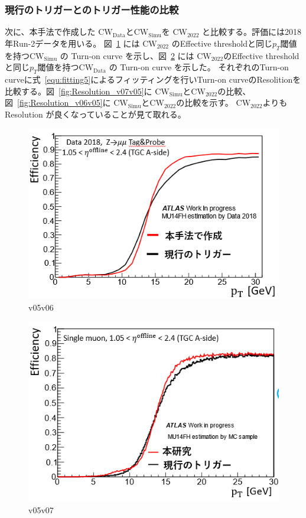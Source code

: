 \subsubsection{現行のトリガーとのトリガー性能の比較}
次に、本手法で作成した $\mathrm{CW_{Data}}$と$\mathrm{CW_{Simu}}$を $\mathrm{CW_{2022}}$ と比較する。評価には2018年Run-2データを用いる。
図~\ref{fig:v05v06} には $\mathrm{CW_{2022}}$ のEffective thresholdと同じ$p_T$閾値を持つ$\mathrm{CW_{Simu}}$ の Turn-on curve を示し、図~\ref{fig:v05v07} には $\mathrm{CW_{2022}}$のEffective thresholdと同じ$p_T$閾値を持つ$\mathrm{CW_{Data}}$ の Turn-on curve を示した。
それぞれのTurn-on curveに式~\eqref{equ:fitting5}によるフィッティングを行いTurn-on curveのResolitionを比較する。図~\ref{fig:Resolution_v07v05}に $\mathrm{CW_{Simu}}$と$\mathrm{CW_{2022}}$の比較、図~\ref{fig:Resolution_v06v05}に $\mathrm{CW_{Simu}}$と$\mathrm{CW_{2022}}$の比較を示す。
$\mathrm{CW_{2022}}$よりも Resolution が良くなっていることが見て取れる。

\begin{figure}[tb]
  \centering
  \includegraphics[clip, width=12cm]{fig/4/hikaku_v05_v06.png}
  \caption{v05v06}
  \label{fig:v05v06}
\end{figure}

\begin{figure}[tb]
  \centering
  \includegraphics[clip, width=12cm]{fig/4/hikaku_v05_v07.png}
  \caption{v05v07}
  \label{fig:v05v07}
\end{figure}

